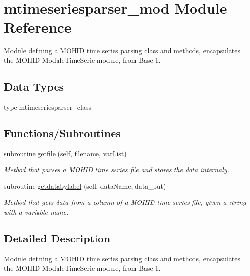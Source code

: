 \hypertarget{namespacemtimeseriesparser__mod}{}\section{mtimeseriesparser\+\_\+mod Module Reference}
\label{namespacemtimeseriesparser__mod}


Module defining a M\+O\+H\+ID time series parsing class and methods, encapsulates the M\+O\+H\+ID Module\+Time\+Serie module, from Base 1.  


\subsection*{Data Types}
\begin{DoxyCompactItemize}
\item 
type \mbox{\hyperlink{structmtimeseriesparser__mod_1_1mtimeseriesparser__class}{mtimeseriesparser\+\_\+class}}
\end{DoxyCompactItemize}
\subsection*{Functions/\+Subroutines}
\begin{DoxyCompactItemize}
\item 
subroutine \mbox{\hyperlink{namespacemtimeseriesparser__mod_abbc158c89dfc5a988984c1e9acd6dc48}{getfile}} (self, filename, var\+List)
\begin{DoxyCompactList}\small\item\em Method that parses a M\+O\+H\+ID time series file and stores the data internaly. \end{DoxyCompactList}\item 
subroutine \mbox{\hyperlink{namespacemtimeseriesparser__mod_a99a6266d1929abd218dd968d5c27a30d}{getdatabylabel}} (self, data\+Name, data\+\_\+out)
\begin{DoxyCompactList}\small\item\em Method that gets data from a column of a M\+O\+H\+ID time series file, given a string with a variable name. \end{DoxyCompactList}\end{DoxyCompactItemize}


\subsection{Detailed Description}
Module defining a M\+O\+H\+ID time series parsing class and methods, encapsulates the M\+O\+H\+ID Module\+Time\+Serie module, from Base 1. 

